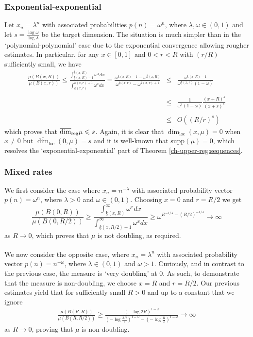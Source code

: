 \subsubsection{Exponential-exponential}



Let $ x_n = \lambda^{n} $ with associated probabilities $p(n)=\omega^{n}$, where $\lambda, \omega \in (0,1)$ and let $s=\frac{\log \omega}{\log \lambda}$ be the target dimension. The situation is much simpler than in the `polynomial-polynomial' case due to the exponential convergence allowing rougher estimates.  In particular, for any $x \in [0,1]$ and $0<r<R$ with $(r/R)$ sufficiently small, we have
\begin{eqnarray*}
	\frac{\mu(B(x,R))}{\mu(B(x,r))} \le \frac{\int_{\underline{k}(x,R)-1}^{\overline{k}(x,R)} \omega^x dx}{\int_{\underline{k}(x,r)}^{\overline{k}(x,r)+1} \omega^x dx} = \frac{\omega^{\underline{k}(x,R)-1} - \omega^{\overline{k}(x,R)} }{\omega^{\underline{k}(x,r)}-\omega^{\overline{k}(x,r)+1}  }  &\le&  \frac{\omega^{\underline{k}(x,R)-1}   }{\omega^{\underline{k}(x,r)}(1-\omega)  } \\ \\
	&  \le& \frac{1}{\omega^2(1-\omega)} \frac{(x+R)^s}{(x+r)^s} \\ \\
	&  \le& O\left(  (R/r)^s \right)
\end{eqnarray*}
which proves that $\overline{\dim}_{\textup{reg}} \mu \leqslant s$.  Again,  it is clear that $\overline{\dim}_{\text{loc}}(x,\mu)=0$ when $x\neq 0$ but $\overline{\dim}_{\text{loc}}(0,\mu)= s$ and it is well-known that $\text{supp}(\mu) = 0$, which resolves the `exponential-exponential' part of  Theorem \ref{ch-upper-reg:sequences}.






\subsubsection{Mixed rates}


We first consider the case where  $x_n=n^{-\lambda}$ with associated probability vector $p(n)=\omega^n$, where $\lambda>0$ and $\omega\in(0,1)$.  Choosing  $x=0$ and $r=R/2$ we get
\[
\frac{\mu(B(0,R))}{\mu(B(0,R/2))}   \geq  \frac{\int_{\underline{k}(x,R)}^\infty \omega^x dx}{\int_{\underline{k}(x,R/2)-1}^\infty \omega^x dx} \geq   \omega^{R^{-1/\lambda}-(R/2)^{-1/\lambda}} \to \infty
\]
as $R \to 0$, which proves that $\mu$ is not doubling, as required.
\\ \\
We now consider the opposite case, where $x_n=\lambda^{n}$ with associated probability vector $p(n)=n^{-\omega}$, where $\lambda\in (0,1)$ and $\omega > 1$. Curiously, and in contrast to the previous case,  the measure is `very doubling' at 0. As such, to demonstrate that the measure is non-doubling, we choose $x=R$ and $r=R/2$.  Our previous estimates yield that for sufficiently small $R>0$ and up to a constant that we ignore
\begin{eqnarray*}
	\frac{\mu(B(R,R))}{\mu(B(R,R/2))}   \geq  \frac{(-\log 2R)^{1-\omega}}{(-\log \frac{3R}{2})^{1-\omega} - (-\log\frac{R}{2} )^{1-\omega}}   \to \infty
\end{eqnarray*}
as $R \to 0$, proving that  $\mu$ is non-doubling.
